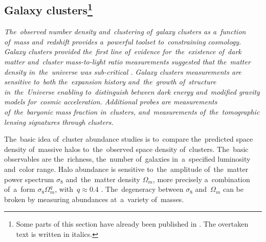 \subsection[Galaxy clusters]{Galaxy clusters\footnote{Some parts of this section have already been published in \textcite{mastersthesis_vrastil}. The overtaken text is written in italics.}}
\label{ssec:gc}
{\itshape
The~observed number density and~clustering of~galaxy clusters as a~function of~mass and~redshift provides a~powerful toolset to~constraining cosmology.  Galaxy clusters provided the~first line of~evidence for~the~existence of~dark matter \textcite{zwicky} and~cluster mass-to-light ratio measurements suggested that the~matter density in~the~universe was sub-critical \textcite{Gott}. Galaxy clusters measurements are sensitive to~both the~expansion history and~the~growth of~structure in~the~Universe enabling to~distinguish between dark energy and~modified gravity models for~cosmic acceleration. Additional probes are measurements of~the~baryonic mass fraction in~clusters, and~measurements of~the~tomographic lensing signatures through clusters.

The~basic idea of~cluster abundance studies is to~compare the~predicted space density of~massive halos to~the~observed space density of~clusters. The~basic observables are the~richness, the~number of~galaxies in~a~specified luminosity and~color range. Halo abundance is sensitive to~the~amplitude of~the~matter power spectrum $\sigma_8$ and~the~matter density $\Omega_m$, more precisely a~combination of~a~form $\sigma_8\Omega_m^q$, with~$q\approx0.4$ \textcite{white}. The~degeneracy between $\sigma_8$ and~$\Omega_m$ can be broken by measuring abundances at~a~variety of~masses.
}
